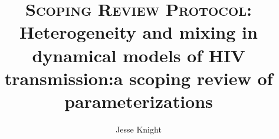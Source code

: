 
\newcommand{\reviewtitle}{%
  Heterogeneity and mixing in
  dynamical models of HIV transmission:\linebreak[1]
  a scoping review of parameterizations}
\title{\Large\textsc{\large{Scoping Review Protocol:}}\\\reviewtitle}
\author{Jesse Knight}